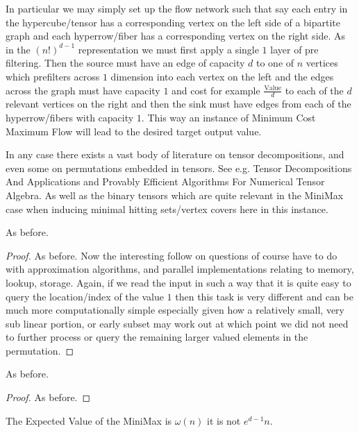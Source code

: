 \documentclass[12pt]{article}
\begin{document}
In particular we may simply set up the flow network such that say each entry in the hypercube/tensor has a corresponding vertex on the left side of a bipartite graph and each hyperrow/fiber has a corresponding vertex on the right side. As in the $(n!)^{d-1}$ representation we must first apply a single $1$ layer of pre filtering. Then the source must have an edge of capacity $d$ to one of $n$ vertices which prefilters across $1$ dimension into each vertex on the left and the edges across the graph must have capacity $1$ and cost for example $\frac{\text{Value}}{d}$ to each of the $d$ relevant vertices on the right and then the sink must have edges from each of the hyperrow/fibers with capacity $1$. This way an instance of Minimum Cost Maximum Flow will lead to the desired target output value.

In any case there exists a vast body of literature on tensor decompositions, and even some on permutations embedded in tensors. See e.g. Tensor Decompositions And Applications and Provably Efficient Algorithms For Numerical Tensor Algebra. As well as the binary tensors which are quite relevant in the MiniMax case when inducing minimal hitting sets/vertex covers here in this instance.

\begin{theorem}\label{Thm:MiniMax Algorithm}
	As before.
\end{theorem}

\begin{proof}
	As before. Now the interesting follow on questions of course have to do with approximation algorithms, and parallel implementations relating to memory, lookup, storage. Again, if we read the input in such a way that it is quite easy to query the location/index of the value $1$ then this task is very different and can be much more computationally simple especially given how a relatively small, very sub linear portion, or early subset may work out at which point we did not need to further process or query the remaining larger valued elements in the permutation.
\end{proof}

\begin{theorem}\label{Thm:MiniMax Bounds}
	As before.
\end{theorem}

\begin{proof}
	As before.
\end{proof}

\begin{theorem}\label{Thm:MiniMax Expected Value And Sum}
	The Expected Value of the MiniMax is $\omega(n)$ it is not $e^{d-1} n$.
\end{theorem}
\end{document}
